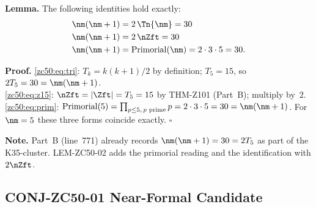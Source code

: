 \documentclass[12pt, a4paper]{article}
\begin{document}
\begin{formalbox}[title={LEM-ZC50-02: $n_m(n_m{+}1) = 2\nZft =
  \mathrm{Primorial}(n_m)$}]
\textbf{Lemma.}
The following identities hold exactly:
\begin{align}
  \nm(\nm+1) &= 2\,\Tn{\nm} = 30 \label{zc50:eq:tri}\\
  \nm(\nm+1) &= 2\,\nZft = 30 \label{zc50:eq:z15}\\
  \nm(\nm+1) &= \mathrm{Primorial}(\nm) = 2\cdot 3\cdot 5 = 30.
  \label{zc50:eq:prim}
\end{align}

\textbf{Proof.}
\eqref{zc50:eq:tri}: $T_k = k(k+1)/2$ by definition; $T_5=15$,
so $2T_5=30=\nm(\nm+1)$.\\
\eqref{zc50:eq:z15}: $\nZft = |\Zft| = T_5 = 15$ by THM-Z101
(Part~B); multiply by~$2$.\\
\eqref{zc50:eq:prim}: $\text{Primorial}(5) = \prod_{p\le 5,\,p\text{
prime}} p = 2\cdot3\cdot5 = 30 = \nm(\nm+1)$.
For $\nm = 5$ these three forms coincide exactly.
\hfill$\square$

\textbf{Note.} Part~B (line~771) already records
$\nm(\nm+1) = 30 = 2T_5$ as part of the K35-cluster.
LEM-ZC50-02 adds the primorial reading
and the identification with $2\nZft$.
\end{formalbox}

\subsection{CONJ-ZC50-01 \quad Near-Formal Candidate}

\end{document}
